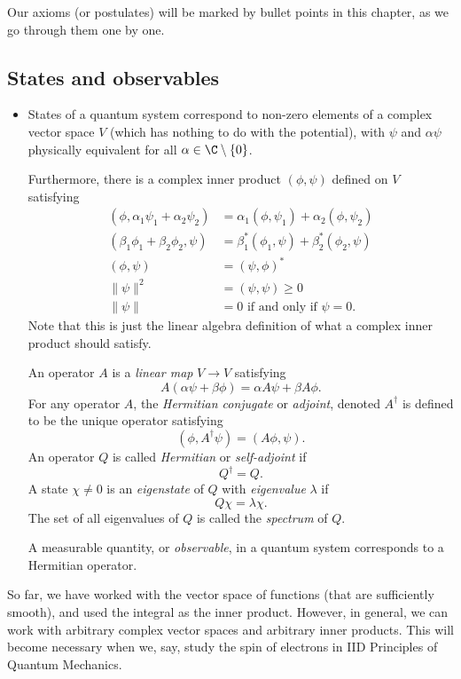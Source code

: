 \documentclass[a4paper]{article}
\begin{document}
Our axioms (or postulates) will be marked by bullet points in this chapter, as we go through them one by one.

\subsection{States and observables}
\begin{itemize}
  \item States of a quantum system correspond to non-zero elements of a complex vector space $V$ (which has nothing to do with the potential), with $\psi$ and $\alpha \psi$ physically equivalent for all $\alpha \in \C\setminus \{0\}$.

    Furthermore, there is a complex inner product $(\phi, \psi)$ defined on $V$ satisfying
    \begin{align*}
      (\phi, \alpha_1 \psi_1 + \alpha_2 \psi_2) &= \alpha_1(\phi, \psi_1) + \alpha_2(\phi, \psi_2)\\
      (\beta_1 \phi_1 + \beta_2 \phi_2, \psi) &= \beta_1^*(\phi_1, \psi) + \beta_2^*(\phi_2, \psi)\\
      (\phi, \psi) &= (\psi, \phi)^*\\
      \|\psi\|^2 &= (\psi, \psi) \geq 0\\
      \|\psi\| &= 0 \text{ if and only if } \psi = 0.
    \end{align*}
    Note that this is just the linear algebra definition of what a complex inner product should satisfy.

    An operator $A$ is a \emph{linear map} $V \to V$ satisfying
    \[
      A(\alpha \psi + \beta \phi) = \alpha A\psi + \beta A\phi.
    \]
    For any operator $A$, the \emph{Hermitian conjugate} or \emph{adjoint}, denoted $A^{\dagger}$ is defined to be the unique operator satisfying
    \[
      (\phi, A^{\dagger}\psi) = (A \phi, \psi).
    \]
    An operator $Q$ is called \emph{Hermitian} or \emph{self-adjoint} if
    \[
      Q^{\dagger} = Q.
    \]
    A state $\chi \not= 0$ is an \emph{eigenstate} of $Q$ with \emph{eigenvalue} $\lambda$ if
    \[
      Q \chi = \lambda \chi.
    \]
    The set of all eigenvalues of $Q$ is called the \emph{spectrum} of $Q$.

    A measurable quantity, or \emph{observable}, in a quantum system corresponds to a Hermitian operator.
\end{itemize}
So far, we have worked with the vector space of functions (that are sufficiently smooth), and used the integral as the inner product. However, in general, we can work with arbitrary complex vector spaces and arbitrary inner products. This will become necessary when we, say, study the spin of electrons in IID Principles of Quantum Mechanics.
\end{document}
